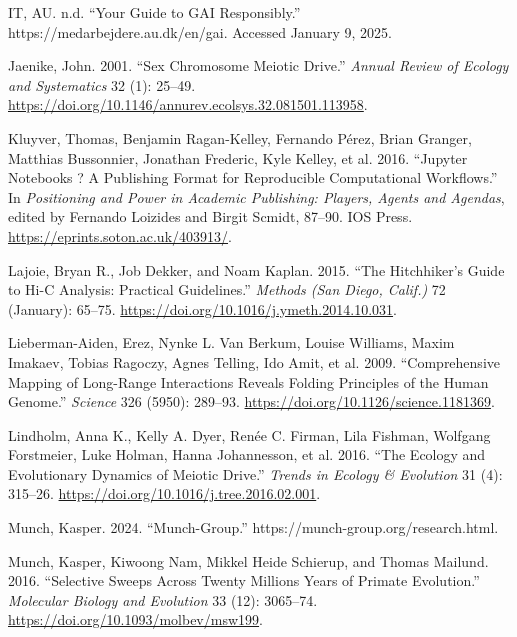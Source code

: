\documentclass[
  11pt,
  a4paper,
]{scrbook}
\newlength{\cslhangindent}
\newenvironment{CSLReferences}[2] %
 {\begin{list}{}{%
  \setlength{\itemindent}{0pt}
  \setlength{\leftmargin}{0pt}
  \setlength{\parsep}{0pt}
  \ifodd #1
   \setlength{\leftmargin}{\cslhangindent}
   \setlength{\itemindent}{-1\cslhangindent}
  \fi
  \setlength{\itemsep}{#2\baselineskip}}}
 {\end{list}}
\let\oldemph\emph
\renewcommand\emph[1]{\oldemph{\color{gray}#1}}
\begin{document}
\begin{CSLReferences}{1}{0}
IT, AU. n.d. {``Your Guide to {GAI} Responsibly.''}
https://medarbejdere.au.dk/en/gai. Accessed January 9, 2025.

Jaenike, John. 2001. {``Sex {Chromosome Meiotic Drive}.''} \emph{Annual
Review of Ecology and Systematics} 32 (1): 25--49.
\url{https://doi.org/10.1146/annurev.ecolsys.32.081501.113958}.

Kluyver, Thomas, Benjamin Ragan-Kelley, Fernando Pérez, Brian Granger,
Matthias Bussonnier, Jonathan Frederic, Kyle Kelley, et al. 2016.
{``Jupyter Notebooks ? A Publishing Format for Reproducible
Computational Workflows.''} In \emph{Positioning and Power in Academic
Publishing: Players, Agents and Agendas}, edited by Fernando Loizides
and Birgit Scmidt, 87--90. IOS Press.
\url{https://eprints.soton.ac.uk/403913/}.

Lajoie, Bryan R., Job Dekker, and Noam Kaplan. 2015. {``The
{Hitchhiker}'s {Guide} to {Hi-C Analysis}: {Practical} Guidelines.''}
\emph{Methods (San Diego, Calif.)} 72 (January): 65--75.
\url{https://doi.org/10.1016/j.ymeth.2014.10.031}.

Lieberman-Aiden, Erez, Nynke L. Van Berkum, Louise Williams, Maxim
Imakaev, Tobias Ragoczy, Agnes Telling, Ido Amit, et al. 2009.
{``Comprehensive {Mapping} of {Long-Range Interactions Reveals Folding
Principles} of the {Human Genome}.''} \emph{Science} 326 (5950):
289--93. \url{https://doi.org/10.1126/science.1181369}.

Lindholm, Anna K., Kelly A. Dyer, Renée C. Firman, Lila Fishman,
Wolfgang Forstmeier, Luke Holman, Hanna Johannesson, et al. 2016. {``The
{Ecology} and {Evolutionary Dynamics} of {Meiotic Drive}.''}
\emph{Trends in Ecology \& Evolution} 31 (4): 315--26.
\url{https://doi.org/10.1016/j.tree.2016.02.001}.

Munch, Kasper. 2024. {``Munch-Group.''}
https://munch-group.org/research.html.

Munch, Kasper, Kiwoong Nam, Mikkel Heide Schierup, and Thomas Mailund.
2016. {``Selective {Sweeps} Across {Twenty Millions Years} of {Primate
Evolution}.''} \emph{Molecular Biology and Evolution} 33 (12): 3065--74.
\url{https://doi.org/10.1093/molbev/msw199}.


\end{CSLReferences}
\end{document}
